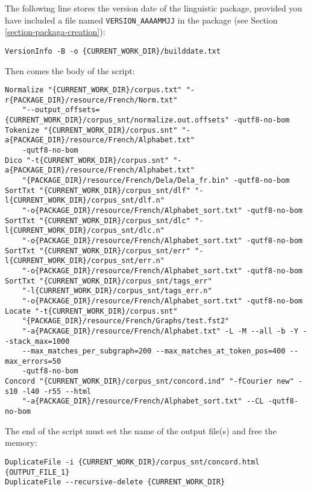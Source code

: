 \noindent The following line stores the version date of the linguistic package,
provided you have included a file named \verb$VERSION_AAAAMMJJ$ in the package
(see Section \ref{section-packaga-creation}):

\begin{Verbatim}[fontsize=\small,fontfamily=helvetica]
VersionInfo -B -o {CURRENT_WORK_DIR}/builddate.txt
\end{Verbatim}

\noindent Then comes the body of the script:

\begin{Verbatim}[fontsize=\small,fontfamily=helvetica]
Normalize "{CURRENT_WORK_DIR}/corpus.txt" "-r{PACKAGE_DIR}/resource/French/Norm.txt" 
    "--output_offsets={CURRENT_WORK_DIR}/corpus_snt/normalize.out.offsets" -qutf8-no-bom
Tokenize "{CURRENT_WORK_DIR}/corpus.snt" "-a{PACKAGE_DIR}/resource/French/Alphabet.txt"
    -qutf8-no-bom
Dico "-t{CURRENT_WORK_DIR}/corpus.snt" "-a{PACKAGE_DIR}/resource/French/Alphabet.txt" 
    "{PACKAGE_DIR}/resource/French/Dela/Dela_fr.bin" -qutf8-no-bom
SortTxt "{CURRENT_WORK_DIR}/corpus_snt/dlf" "-l{CURRENT_WORK_DIR}/corpus_snt/dlf.n" 
    "-o{PACKAGE_DIR}/resource/French/Alphabet_sort.txt" -qutf8-no-bom
SortTxt "{CURRENT_WORK_DIR}/corpus_snt/dlc" "-l{CURRENT_WORK_DIR}/corpus_snt/dlc.n" 
    "-o{PACKAGE_DIR}/resource/French/Alphabet_sort.txt" -qutf8-no-bom
SortTxt "{CURRENT_WORK_DIR}/corpus_snt/err" "-l{CURRENT_WORK_DIR}/corpus_snt/err.n" 
    "-o{PACKAGE_DIR}/resource/French/Alphabet_sort.txt" -qutf8-no-bom
SortTxt "{CURRENT_WORK_DIR}/corpus_snt/tags_err"
    "-l{CURRENT_WORK_DIR}/corpus_snt/tags_err.n" 
    "-o{PACKAGE_DIR}/resource/French/Alphabet_sort.txt" -qutf8-no-bom
Locate "-t{CURRENT_WORK_DIR}/corpus.snt"
    "{PACKAGE_DIR}/resource/French/Graphs/test.fst2" 
    "-a{PACKAGE_DIR}/resource/French/Alphabet.txt" -L -M --all -b -Y --stack_max=1000
    --max_matches_per_subgraph=200 --max_matches_at_token_pos=400 --max_errors=50
    -qutf8-no-bom
Concord "{CURRENT_WORK_DIR}/corpus_snt/concord.ind" "-fCourier new" -s10 -l40 -r55 --html 
    "-a{PACKAGE_DIR}/resource/French/Alphabet_sort.txt" --CL -qutf8-no-bom
\end{Verbatim}

\noindent The end of the script must set the name of the output file(s) and free the memory:

\begin{Verbatim}[fontsize=\small,fontfamily=helvetica]
DuplicateFile -i {CURRENT_WORK_DIR}/corpus_snt/concord.html {OUTPUT_FILE_1}
DuplicateFile --recursive-delete {CURRENT_WORK_DIR}
\end{Verbatim}

